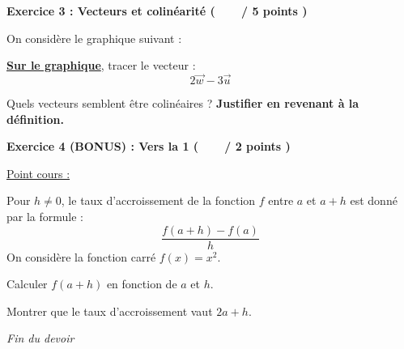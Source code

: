 \documentclass[12pt,a4paper]{exam}
\begin{document}
\vspace{10pt}

\noindent
\textbf{Exercice 3 : Vecteurs et colinéarité (\ \ \ \  / 5 points )}

\vspace{5pt}

On considère le graphique suivant : 

\begin{center}
\end{center}

\begin{questions}
    \question[3] \underline{\textbf{Sur le graphique}}, tracer le vecteur :
    \[2\overrightarrow{w}
    - 3\overrightarrow{u}\]

    \question[2] Quels vecteurs semblent être colinéaires ? \textbf{Justifier en revenant 
    à la définition.}
\end{questions}

\vspace{20pt}


\noindent
\textbf{Exercice 4 (BONUS) : Vers la 1 (\ \ \ \  / 2 points )}

\vspace{5pt}

\underline{Point cours :}
\vspace{5pt}

Pour $h \neq 0$, le taux d'accroissement de la fonction $f$ entre $a$ et $a + h$ est donné 
par la formule :
\[
\dfrac{f(a+h)-f(a)}{h}
\]
On considère la fonction carré $f(x) = x^2$.

\begin{questions}
    \question Calculer $f(a+h)$ en fonction de $a$ et $h$.

    \question Montrer que le taux d'accroissement vaut $2a + h$.
\end{questions}

\vspace{20pt}

\begin{center}
    \textit{Fin du devoir}
\end{center}
\end{document}

